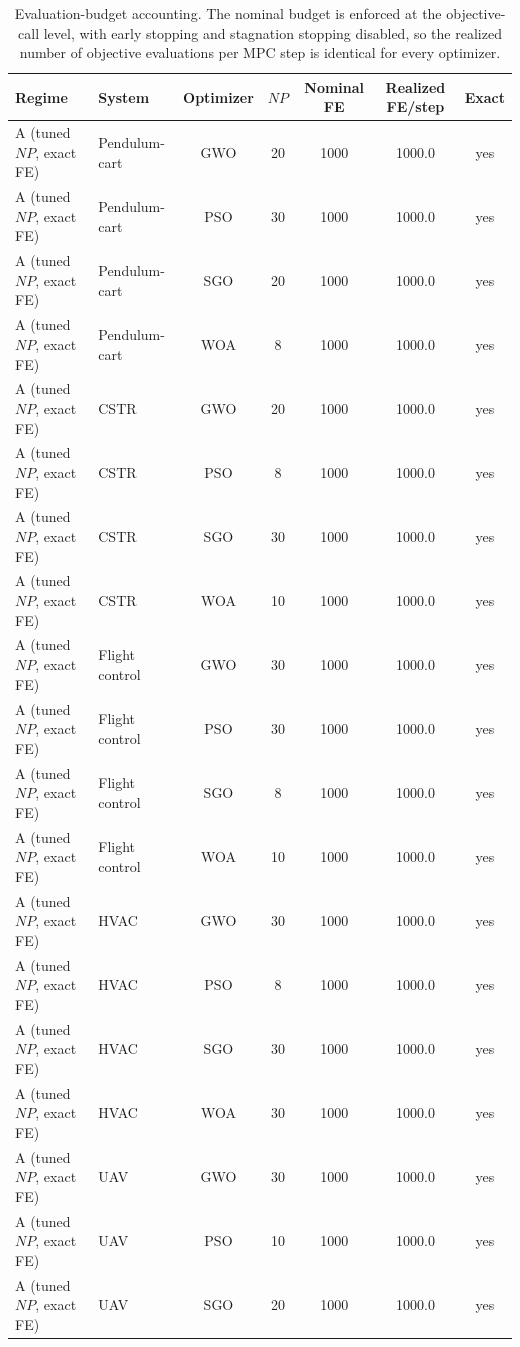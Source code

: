 \begin{table}[htbp]
\centering
\small
\caption{Evaluation-budget accounting. The nominal budget is enforced at the objective-call level, with early stopping and stagnation stopping disabled, so the realized number of objective evaluations per MPC step is identical for every optimizer.}
\label{tab:primary_budget}
\begin{tabular}{@{}llccccc@{}}
\toprule
Regime & System & Optimizer & $NP$ & Nominal FE & Realized FE/step & Exact \\
\midrule
A (tuned $NP$, exact FE) & Pendulum-cart & GWO & 20 & 1000 & 1000.0 & yes \\
A (tuned $NP$, exact FE) & Pendulum-cart & PSO & 30 & 1000 & 1000.0 & yes \\
A (tuned $NP$, exact FE) & Pendulum-cart & SGO & 20 & 1000 & 1000.0 & yes \\
A (tuned $NP$, exact FE) & Pendulum-cart & WOA & 8 & 1000 & 1000.0 & yes \\
A (tuned $NP$, exact FE) & CSTR & GWO & 20 & 1000 & 1000.0 & yes \\
A (tuned $NP$, exact FE) & CSTR & PSO & 8 & 1000 & 1000.0 & yes \\
A (tuned $NP$, exact FE) & CSTR & SGO & 30 & 1000 & 1000.0 & yes \\
A (tuned $NP$, exact FE) & CSTR & WOA & 10 & 1000 & 1000.0 & yes \\
A (tuned $NP$, exact FE) & Flight control & GWO & 30 & 1000 & 1000.0 & yes \\
A (tuned $NP$, exact FE) & Flight control & PSO & 30 & 1000 & 1000.0 & yes \\
A (tuned $NP$, exact FE) & Flight control & SGO & 8 & 1000 & 1000.0 & yes \\
A (tuned $NP$, exact FE) & Flight control & WOA & 10 & 1000 & 1000.0 & yes \\
A (tuned $NP$, exact FE) & HVAC & GWO & 30 & 1000 & 1000.0 & yes \\
A (tuned $NP$, exact FE) & HVAC & PSO & 8 & 1000 & 1000.0 & yes \\
A (tuned $NP$, exact FE) & HVAC & SGO & 30 & 1000 & 1000.0 & yes \\
A (tuned $NP$, exact FE) & HVAC & WOA & 30 & 1000 & 1000.0 & yes \\
A (tuned $NP$, exact FE) & UAV & GWO & 30 & 1000 & 1000.0 & yes \\
A (tuned $NP$, exact FE) & UAV & PSO & 10 & 1000 & 1000.0 & yes \\
A (tuned $NP$, exact FE) & UAV & SGO & 20 & 1000 & 1000.0 & yes \\

\end{tabular}
\end{table}
